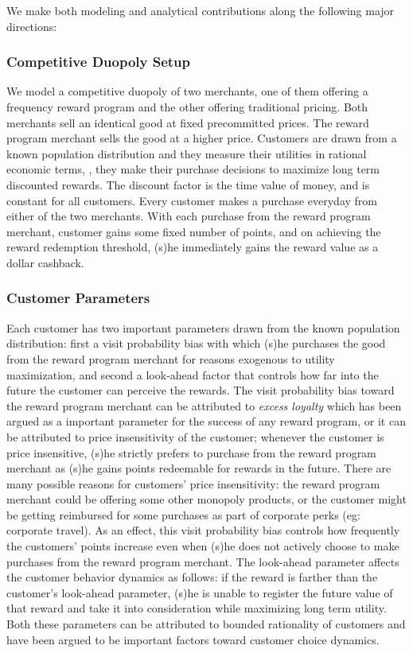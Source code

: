 We make both modeling and analytical contributions along the following major directions:

\subsubsection{Competitive Duopoly Setup}
We model a competitive duopoly of two merchants, one of them offering a frequency reward program and the other offering traditional pricing.
Both merchants sell an identical good at fixed precommitted prices.
The reward program merchant sells the good at a higher price.
Customers are drawn from a known population distribution and they measure their utilities in rational economic terms, \ie, they make their purchase decisions to maximize long term discounted rewards.
The discount factor is the time value of money, and is constant for all customers.
Every customer makes a purchase everyday from either of the two merchants.
With each purchase from the reward program merchant, customer gains some fixed number of points, and on achieving the reward redemption threshold, (s)he immediately gains the reward value as a dollar cashback.

\subsubsection{Customer Parameters}
Each customer has two important parameters drawn from the known population distribution: first a visit probability bias with which (s)he purchases the good from the reward program merchant for reasons exogenous to utility maximization, and second a look-ahead factor that controls how far into the future the customer can perceive the rewards.
The visit probability bias toward the reward program merchant can be attributed to \emph{excess loyalty} which has been argued as a important parameter for the success of any reward program, or it can be attributed to price insensitivity of the customer; whenever the customer is price insensitive, (s)he strictly prefers to purchase from the reward program merchant as (s)he gains points redeemable for rewards in the future.
There are many possible reasons for customers' price insensitivity: the reward program merchant could be offering some other monopoly products, or the customer might be getting reimbursed for some purchases as part of corporate perks (eg: corporate travel).
As an effect, this visit probability bias controls how frequently the customers' points increase even when (s)he does not actively choose to make purchases from the reward program merchant.
The look-ahead parameter affects the customer behavior dynamics as follows: if the reward is farther than the customer's look-ahead parameter, (s)he is unable to register the future value of that reward and take it into consideration while maximizing long term utility.
Both these parameters can be attributed to bounded rationality of customers and have been argued to be important factors toward customer choice dynamics.


